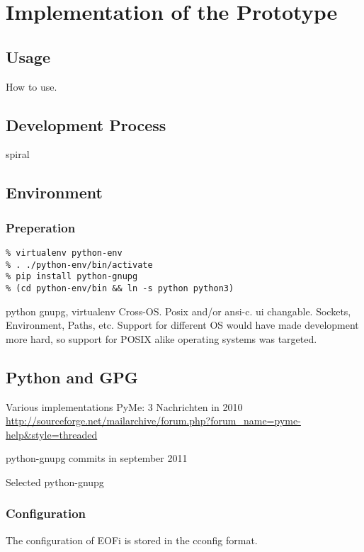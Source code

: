 \chapter{Implementation of the Prototype}
\section{Usage}
How to use.
\section{Development Process}
spiral
\section{Environment}
\subsection{Preperation}
\begin{verbatim}
% virtualenv python-env
% . ./python-env/bin/activate
% pip install python-gnupg
% (cd python-env/bin && ln -s python python3)
\end{verbatim}
python gnupg, virtualenv
Cross-OS. Posix and/or ansi-c. ui changable.
Sockets, Environment, Paths, etc.
Support for different OS would have made development more
hard, so support for POSIX alike operating systems was targeted.

\section{Python and GPG}
Various implementations \cite{python-gpg}
PyMe: 3 Nachrichten in 2010
\url{http://sourceforge.net/mailarchive/forum.php?forum_name=pyme-help&style=threaded}

python-gnupg commits in september 2011 \cite{python-gnupg}

Selected python-gnupg

\subsection{Configuration}
The configuration of EOFi is stored in the cconfig\cite{cconfig} format.

